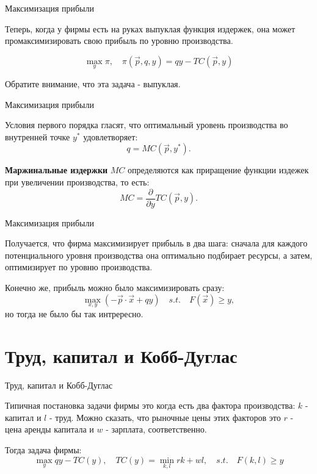 \documentclass{beamer}
\begin{document}
\begin{frame}{Максимизация прибыли}

Теперь, когда у фирмы есть на руках выпуклая функция издержек, она может промаксимизировать свою прибыль по уровню производства.

$$ \max_{y} \pi, \quad \pi(\vec p, q, y) = q y - TC(\vec p, y)$$

Обратите внимание, что эта задача - выпуклая.

\end{frame}

\begin{frame}{Максимизация прибыли}

Условия первого порядка гласят, что оптимальный уровень производства во внутренней точке $y^{\ast}$ удовлетворяет:
$$ q = MC(\vec p, y^{\ast}).$$

\begin{definition}
\textbf{Маржинальные издержки} $MC$ определяются как приращение функции издежек при увеличении производства, то есть: 
$$ MC = \frac{\partial}{\partial y} TC(\vec p, y).$$
\end{definition}

\end{frame}

\begin{frame}{Максимизация прибыли}

Получается, что фирма максимизирует прибыль в два шага: сначала для каждого потенциального уровня производства она оптимально подбирает ресурсы, а затем, оптимизирует по уровню производства. 

Конечно же, прибыль можно было максимизировать сразу:
$$ \max_{x,y} (- \vec p \cdot \vec x + q y) \quad s.t. \quad F(\vec x)  \geqslant y,$$
но тогда не было бы так интрересно.

\end{frame}

\section{Труд, капитал и Кобб-Дуглас}

\begin{frame}{Труд, капитал и Кобб-Дуглас}

Типичная постановка задачи фирмы это когда есть два фактора производства: $k$ - капитал и $l$ - труд. Можно сказать, что рыночные цены этих факторов это $r$ - цена аренды капитала и $w$ - зарплата, соответственно. 

Тогда задача фирмы:
$$ \max_y q y - TC(y), \quad TC(y) = \min_{k,l} rk + wl, \quad s.t. \quad F(k,l) \geqslant y$$

\end{frame}
\end{document}
